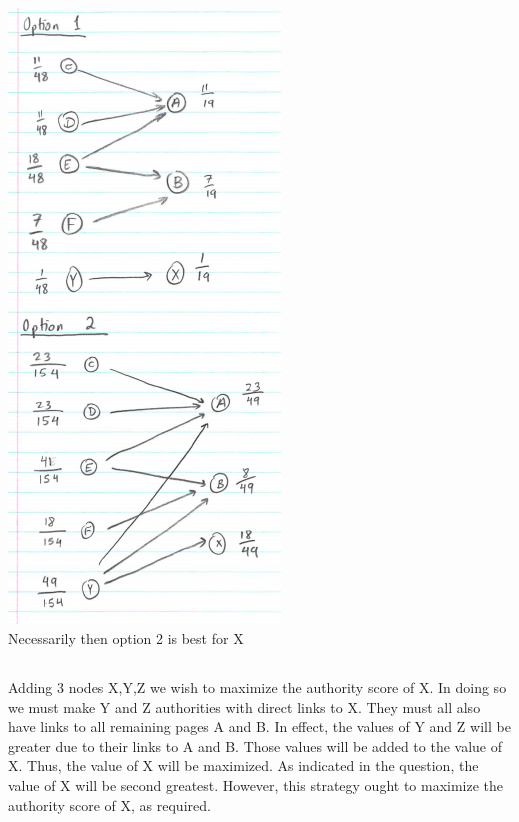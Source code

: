 \documentclass[12pt]{article}
\begin{document}
\subsection{}
\includegraphics{A2Q4b.PNG}\\
Necessarily then option 2 is best for X
\newpage
\subsection{}
Adding 3 nodes X,Y,Z we wish to maximize the authority score of X. In doing so we must make Y and Z authorities with direct links to X. They must all also have links to all remaining pages A and B. In effect, the values of Y and Z will be greater due to their links to A and B. Those values will be added to the value of X. Thus, the value of X will be maximized. As indicated in the question, the value of X will be second greatest. However, this strategy ought to maximize the authority score of X, as required. 
\newpage
\section{}
\end{document}
